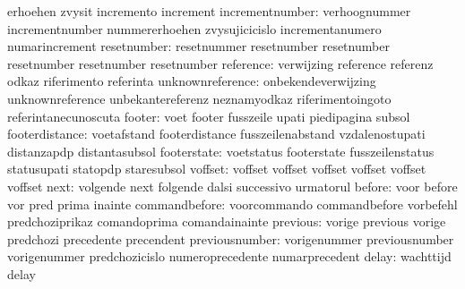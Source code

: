                            erhoehen                  zvysit
                           incremento                increment %
          incrementnumber: verhoognummer             incrementnumber
                           nummererhoehen            zvysujicicislo
                           incrementanumero          numarincrement
resetnumber: resetnummer             resetnumber
             resetnumber             resetnumber
             resetnumber             resetnumber
                reference: verwijzing                reference
                           referenz                  odkaz
                           riferimento               referinta
         unknownreference: onbekendeverwijzing       unknownreference
                           unbekantereferenz         neznamyodkaz
                           riferimentoingoto         referintanecunoscuta
                   footer: voet                      footer
                           fusszeile                 upati
                           piedipagina               subsol
           footerdistance: voetafstand               footerdistance
                           fusszeilenabstand         vzdalenostupati
                           distanzapdp               distantasubsol
              footerstate: voetstatus                footerstate
                           fusszeilenstatus          statusupati
                           statopdp                  staresubsol
                  voffset: voffset                   voffset
                           voffset                   voffset
                           voffset                   voffset
                     next: volgende                  next
                           folgende                  dalsi
                           successivo                urmatorul
                   before: voor                      before
                           vor                       pred
                           prima                     inainte
            commandbefore: voorcommando              commandbefore
                           vorbefehl                 predchoziprikaz
                           comandoprima              comandainainte
                 previous: vorige                    previous
                           vorige                    predchozi
                           precedente                precendent
           previousnumber: vorigenummer              previousnumber
                           vorigenummer              predchozicislo
                           numeroprecedente          numarprecedent
                    delay: wachttijd                 delay

